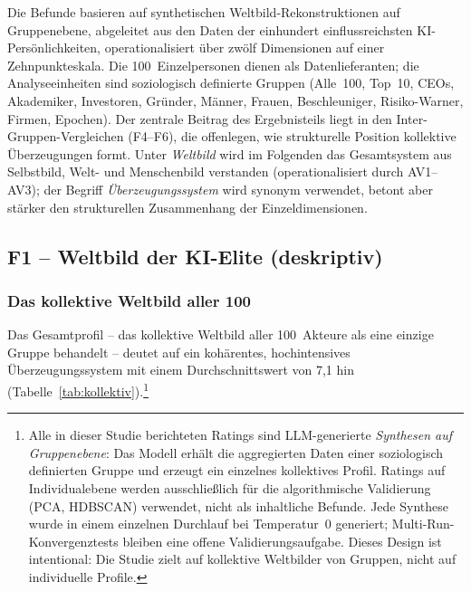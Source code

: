 \documentclass[12pt,a4paper]{article}
\begin{document}
Die Befunde basieren auf synthetischen Weltbild-Rekonstruktionen auf Gruppenebene, abgeleitet aus den Daten der einhundert einflussreichsten KI-Pers\"onlichkeiten, operationalisiert \"uber zw\"olf Dimensionen auf einer Zehnpunkteskala. Die 100~Einzelpersonen dienen als Datenlieferanten; die Analyseeinheiten sind soziologisch definierte Gruppen (Alle~100, Top~10, CEOs, Akademiker, Investoren, Gr\"under, M\"anner, Frauen, Beschleuniger, Risiko-Warner, Firmen, Epochen). Der zentrale Beitrag des Ergebnisteils liegt in den Inter-Gruppen-Vergleichen (F4--F6), die offenlegen, wie strukturelle Position kollektive \"Uberzeugungen formt. Unter \emph{Weltbild} wird im Folgenden das Gesamtsystem aus Selbstbild, Welt- und Menschenbild verstanden (operationalisiert durch AV1--AV3); der Begriff \emph{\"Uberzeugungssystem} wird synonym verwendet, betont aber st\"arker den strukturellen Zusammenhang der Einzeldimensionen.


\subsection{F1 -- Weltbild der KI-Elite (deskriptiv)}
\label{sec:ergebnisse:f1}

\subsubsection{Das kollektive Weltbild aller 100}

Das Gesamtprofil -- das kollektive Weltbild aller 100~Akteure als eine einzige Gruppe behandelt -- deutet auf ein koh\"arentes, hochintensives \"Uberzeugungssystem mit einem Durchschnittswert von 7,1 hin (Tabelle~\ref{tab:kollektiv}).\footnote{Alle in dieser Studie berichteten Ratings sind LLM-generierte \emph{Synthesen auf Gruppenebene}: Das Modell erh\"alt die aggregierten Daten einer soziologisch definierten Gruppe und erzeugt ein einzelnes kollektives Profil. Ratings auf Individualebene werden ausschlie\ss{}lich f\"ur die algorithmische Validierung (PCA, HDBSCAN) verwendet, nicht als inhaltliche Befunde. Jede Synthese wurde in einem einzelnen Durchlauf bei Temperatur~0 generiert; Multi-Run-Konvergenztests bleiben eine offene Validierungsaufgabe. Dieses Design ist intentional: Die Studie zielt auf kollektive Weltbilder von Gruppen, nicht auf individuelle Profile.}
\end{document}
